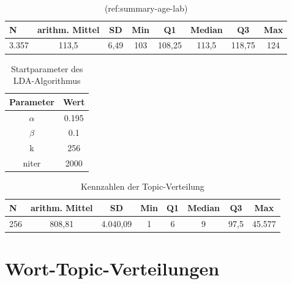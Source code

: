 \documentclass[11pt,a4paper,twoside]{article}
\begin{document}
\begin{table}[!h]

\caption{\label{tab:activity-summary-cut}(ref:summary-age-lab)}
\centering
\begin{tabular}[t]{lccccccc}
\toprule
N & arithm. Mittel & SD & Min & Q1 & Median & Q3 & Max\\
\midrule
3.357 & 113,5 & 6,49 & 103 & 108,25 & 113,5 & 118,75 & 124\\
\bottomrule
\end{tabular}
\end{table}

\begin{table}[!h]

\caption{\label{tab:lda-params}Startparameter des LDA-Algorithmus}
\centering
\begin{tabular}[t]{cc}
\toprule
Parameter & Wert\\
\midrule
$\alpha$ & 0.195\\
$\beta$ & 0.1\\
k & 256\\
niter & 2000\\
\bottomrule
\end{tabular}
\end{table}



\begin{table}[!h]

\caption{\label{tab:topic-assignments-summary}Kennzahlen der Topic-Verteilung}
\centering
\begin{tabular}[t]{lccccccc}
\toprule
N & arithm. Mittel & SD & Min & Q1 & Median & Q3 & Max\\
\midrule
256 & 808,81 & 4.040,09 & 1 & 6 & 9 & 97,5 & 45.577\\
\bottomrule
\end{tabular}
\end{table}

\clearpage

\hypertarget{wort-topic-verteilungen}{%
\section{Wort-Topic-Verteilungen}\label{wort-topic-verteilungen}}
\end{document}
